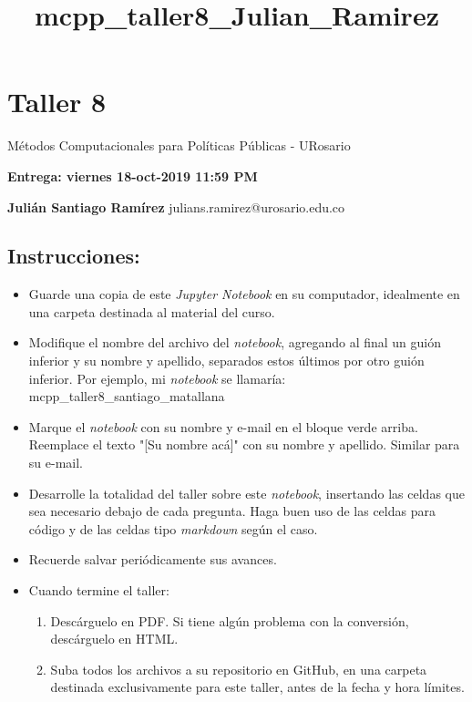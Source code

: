 \documentclass[11pt]{article}
\title{mcpp\_taller8\_Julian\_Ramirez}
\providecommand{\tightlist}{%
      \setlength{\itemsep}{0pt}\setlength{\parskip}{0pt}}
\begin{document}
    
    
    \maketitle
    
    

    
    \section{Taller 8}\label{taller-8}

Métodos Computacionales para Políticas Públicas - URosario

\textbf{Entrega: viernes 18-oct-2019 11:59 PM}

    \textbf{Julián Santiago Ramírez} julians.ramirez@urosario.edu.co

    \subsection{Instrucciones:}\label{instrucciones}

\begin{itemize}
\tightlist
\item
  Guarde una copia de este \emph{Jupyter Notebook} en su computador,
  idealmente en una carpeta destinada al material del curso.
\item
  Modifique el nombre del archivo del \emph{notebook}, agregando al
  final un guión inferior y su nombre y apellido, separados estos
  últimos por otro guión inferior. Por ejemplo, mi \emph{notebook} se
  llamaría: mcpp\_taller8\_santiago\_matallana
\item
  Marque el \emph{notebook} con su nombre y e-mail en el bloque verde
  arriba. Reemplace el texto "{[}Su nombre acá{]}" con su nombre y
  apellido. Similar para su e-mail.
\item
  Desarrolle la totalidad del taller sobre este \emph{notebook},
  insertando las celdas que sea necesario debajo de cada pregunta. Haga
  buen uso de las celdas para código y de las celdas tipo
  \emph{markdown} según el caso.
\item
  Recuerde salvar periódicamente sus avances.
\item
  Cuando termine el taller:

  \begin{enumerate}
  \def\labelenumi{\arabic{enumi}.}
  \tightlist
  \item
    Descárguelo en PDF. Si tiene algún problema con la conversión,
    descárguelo en HTML.
  \item
    Suba todos los archivos a su repositorio en GitHub, en una carpeta
    destinada exclusivamente para este taller, antes de la fecha y hora
    límites.
  \end{enumerate}
\end{itemize}
\end{document}

